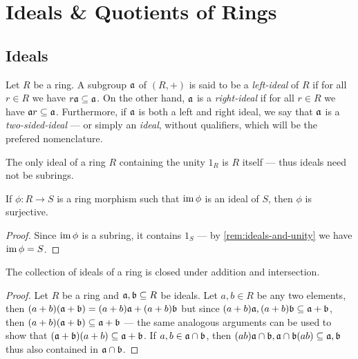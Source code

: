\section{Ideals \& Quotients of Rings}

\subsection{Ideals}

\begin{definition}[Ideal]
\label{def:ring-ideal}
Let \(R\) be a ring. A subgroup \(\mathfrak{a}\) of \((R, +)\) is said to be a
\emph{left-ideal} of \(R\) if for all \(r \in R\) we have
\(r \mathfrak{a} \subseteq \mathfrak{a}\). On the other hand, \(\mathfrak{a}\) is a
\emph{right-ideal} if for all \(r \in R\) we have
\(\mathfrak{a} r \subseteq \mathfrak{a}\). Furthermore, if \(\mathfrak{a}\) is both a
left and right ideal, we say that \(\mathfrak{a}\) is a \emph{two-sided-ideal} ---
or simply an \emph{ideal}, without qualifiers, which will be the prefered
nomenclature.
\end{definition}

\begin{remark}
\label{rem:ideals-and-unity}
The only ideal of a ring \(R\) containing the unity \(1_R\) is \(R\) itself ---
thus ideals need not be subrings.
\end{remark}

\begin{corollary}
\label{cor:image-is-ideal-then-surjective}
If \(\phi: R \to S\) is a ring morphism such that \(\operatorname{im} \phi\) is an ideal of
\(S\), then \(\phi\) is surjective.
\end{corollary}

\begin{proof}
Since \(\operatorname{im} \phi\) is a subring, it contains \(1_S\) --- by
\cref{rem:ideals-and-unity} we have \(\operatorname{im} \phi = S\).
\end{proof}

\begin{corollary}
\label{cor:ideals-addition-intersection}
The collection of ideals of a ring is closed under addition and intersection.
\end{corollary}

\begin{proof}
Let \(R\) be a ring and \(\mathfrak{a}, \mathfrak{b} \subseteq R\) be ideals. Let
\(a, b \in R\) be any two elements, then
\((a + b)(\mathfrak{a} + \mathfrak{b}) = (a + b) \mathfrak{a} + (a + b) \mathfrak{b}\) but
since \((a + b) \mathfrak{a}, (a + b) \mathfrak{b} \subseteq \mathfrak{a} + \mathfrak{b}\),
then \((a + b) (\mathfrak{a} + \mathfrak{b}) \subseteq \mathfrak{a} + \mathfrak{b}\) --- the
same analogous arguments can be used to show that
\((\mathfrak{a} + \mathfrak{b})(a + b) \subseteq \mathfrak{a} + \mathfrak{b}\). If
\(a, b \in \mathfrak{a} \cap \mathfrak{b}\), then
\((ab) \mathfrak{a} \cap \mathfrak{b}, \mathfrak{a} \cap \mathfrak{b} (a b) \subseteq
\mathfrak{a}, \mathfrak{b}\) thus also contained in \(\mathfrak{a} \cap \mathfrak{b}\).
\end{proof}

